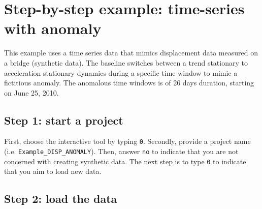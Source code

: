 \section{Step-by-step example: time-series with anomaly}
\label{S:ExampleDispAnomaly}

This example uses a time series data that mimics displacement data measured on a bridge (synthetic data). 
The baseline switches between a trend stationary to acceleration stationary dynamics during a specific time window to mimic a fictitious anomaly.
The anomalous time windows is of 26 days duration, starting on June 25, 2010.


\subsection{Step 1: start a project}

First, choose the interactive tool by typing \colorbox{light-gray}{\lstinline[basicstyle = \mlttfamily \small, backgroundcolor = \color{light-gray}]!0!}.
Secondly, provide a project name (i.e. \lstinline[basicstyle = \mlttfamily \small, backgroundcolor = \color{light-gray}]!Example_DISP_ANOMALY!).
Then, answer \colorbox{light-gray}{\lstinline[basicstyle = \mlttfamily \small, backgroundcolor = \color{light-gray}]!no!} to indicate that you are not concerned with creating synthetic data.
The next step is to type \colorbox{light-gray}{\lstinline[basicstyle = \mlttfamily \small, backgroundcolor = \color{light-gray}]!0!} to indicate that you aim to load new data.


\subsection{Step 2: load the data}

